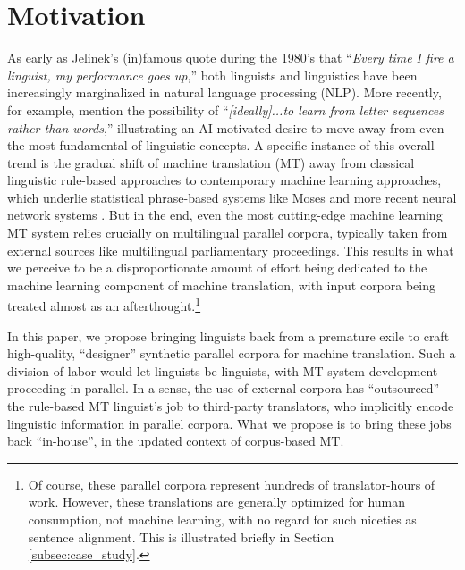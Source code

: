 \section{Motivation} 

As early as Jelinek's (in)famous quote during the 1980's that ``{\em Every time I fire a linguist, my performance goes up},'' both linguists and linguistics have been increasingly marginalized in natural language processing (NLP). 
More recently, for example,  mention the possibility of ``{\em [ideally]...to learn from letter sequences rather than words},'' illustrating an AI-motivated desire to move away from even the most fundamental of linguistic concepts.
A specific instance of this overall trend is the gradual shift of machine translation (MT) away from classical linguistic rule-based approaches  to contemporary machine learning approaches, which underlie statistical phrase-based systems like Moses  and more recent neural network systems .  
But in the end, even the most cutting-edge machine learning MT system relies crucially on multilingual parallel corpora, typically taken from external sources like multilingual parliamentary proceedings. 
This results in what we perceive to be a disproportionate amount of effort being dedicated to the machine learning component of machine translation, with input corpora being treated almost as an afterthought.\footnote{
    Of course, these parallel corpora represent hundreds of translator-hours of work. 
    However, these translations are generally optimized for human consumption, not machine learning, with no regard for such niceties as sentence alignment.
    This is illustrated briefly in Section \ref{subsec:case_study}.
    }

In this paper, we propose bringing linguists back from a premature exile to craft high-quality, ``designer'' synthetic parallel corpora for machine translation.
Such a division of labor would let linguists be linguists, with MT system development proceeding in parallel.  
In a sense, the use of external corpora has ``outsourced'' the rule-based MT linguist's job to third-party translators, who implicitly encode linguistic information in parallel corpora.  
What we propose is to bring these jobs back ``in-house'', in the updated context of corpus-based MT.



